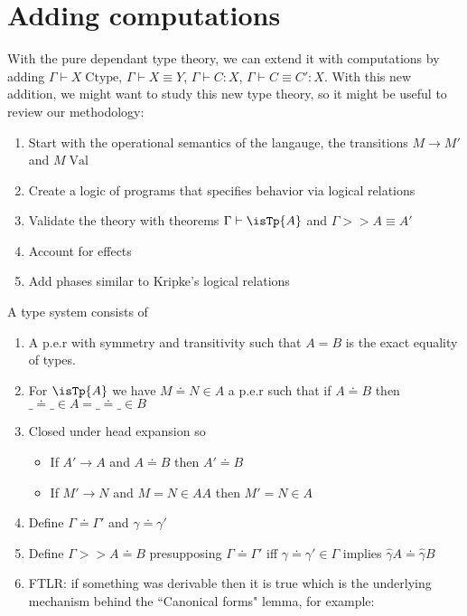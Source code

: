 \documentclass[11pt]{article}
\begin{document}
\section*{Adding computations}
With the pure dependant type theory, we can extend it with computations by adding $\Gamma \vdash X \; \mathrm{Ctype}$, $\Gamma \vdash X \equiv Y$, $\Gamma \vdash C : X$, $\Gamma \vdash C \equiv C' : X$. With this new addition, we might want to study this new type theory, so it might be useful to review our methodology:
\begin{enumerate}
    \item Start with the operational semantics of the langauge, the transitions $M \xrightarrow{} M'$ and $M \; \mathrm{Val}$
    \item Create a logic of programs that specifies behavior via logical relations
    \item Validate the theory with theorems $\Gamma \vdash \isTp{A}$ and $\Gamma >> A \equiv A'$
    \item Account for effects
    \item Add phases similar to Kripke's logical relations
\end{enumerate}
A type system consists of
\begin{enumerate}
    \item A p.e.r with symmetry and transitivity such that $A = B$ is the exact equality of types.
    \item For $\isTp{A}$ we have $M \doteq N \in A$ a p.e.r such that if $A \doteq B$ then $\_ \doteq \_ \in A = \_ \doteq \_ \in B$
    \item Closed under head expansion so
    \begin{itemize}
        \item If $A' \xrightarrow{} A$ and $A \doteq B$ then $A' \doteq B$
        \item If $M' \xrightarrow{} N$ and $M = N \in AA$ then $M' = N \in A$
    \end{itemize}
    \item Define $\Gamma \doteq \Gamma'$ and $\gamma \doteq \gamma'$
    \item Define $\Gamma >> A \doteq B$ presupposing $\Gamma \doteq \Gamma'$ iff $\gamma \doteq \gamma' \in \Gamma$ implies $\hat{\gamma}A \doteq \hat{\gamma}B$
    \item FTLR: if something was derivable then it is true which is the underlying mechanism behind the ``Canonical forms" lemma, for example:
\end{enumerate}
\end{document}

